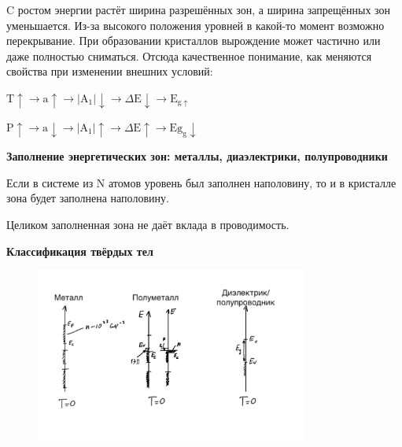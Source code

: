 C ростом энергии растёт ширина разрешённых зон, а ширина запрещённых зон уменьшается. Из-за высокого положения уровней в какой-то момент возможно перекрывание. При образовании кристаллов вырождение может частично или даже полностью сниматься. Отсюда качественное понимание, как меняются свойства при изменении внешних условий:

$\mathrm{T} \uparrow \rightarrow \mathrm{a} \uparrow \rightarrow\left|\mathrm{A}_{1}\right| \downarrow \rightarrow \Delta \mathrm{E} \downarrow \rightarrow \mathrm{E}_{\mathrm{g} \uparrow}$

$\mathrm{P} \uparrow \rightarrow \mathrm{a} \downarrow \rightarrow\left|\mathrm{A}_{1}\right| \uparrow \rightarrow \Delta \mathrm{E} \uparrow \rightarrow \mathrm{Eg}_{\mathrm{g}} \downarrow$

\textbf{Заполнение энергетических зон: металлы, диаэлектрики, полупроводники}

\begin{table}[h!]
    \centering
\end{table}

Если в системе из N атомов уровень был заполнен наполовину, то и в кристалле зона будет заполнена наполовину.

Целиком заполненная зона не даёт вклада в проводимость.

\textbf{Классификация твёрдых тел}

\begin{figure}[h!]
    \centering
    \includegraphics[width=0.8\textwidth]{images/phys_3_4.png}
\end{figure}

